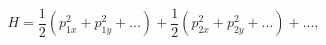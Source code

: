 \begin{equation}
   H =  \frac{1}{2} (p^2_{1x} +p^2_{1y}+ ...) + \frac{1}{2} (p^2_{2x} +p^2_{2y}+ ...) + ... ,  \label{l6}
   \end{equation}

